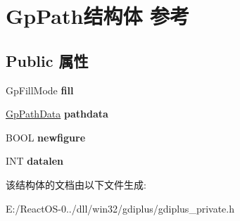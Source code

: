\hypertarget{struct_gp_path}{}\section{Gp\+Path结构体 参考}
\label{struct_gp_path}
\subsection*{Public 属性}
\begin{DoxyCompactItemize}
\item 
\mbox{\label{struct_gp_path_af3d3fd8ae79cfec77acdb254f4963d1b}} 
Gp\+Fill\+Mode {\bfseries fill}
\item 
\mbox{\label{struct_gp_path_ac8fa1bd26f25814f9c52bc23a7f987db}} 
\hyperlink{struct_path_data}{Gp\+Path\+Data} {\bfseries pathdata}
\item 
\mbox{\label{struct_gp_path_ae8cfdbae70fe5c871d7b6a0e6b2a61c2}} 
B\+O\+OL {\bfseries newfigure}
\item 
\mbox{\label{struct_gp_path_ade3fa9c898bc93d9a8b385be88f99512}} 
I\+NT {\bfseries datalen}
\end{DoxyCompactItemize}


该结构体的文档由以下文件生成\+:\begin{DoxyCompactItemize}
\item 
E\+:/\+React\+O\+S-\/0../dll/win32/gdiplus/gdiplus\+\_\+private.\+h\end{DoxyCompactItemize}
